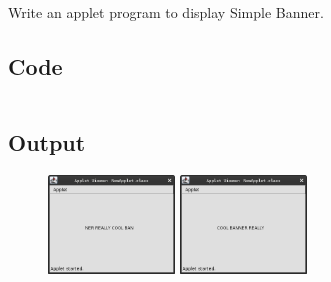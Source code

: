 \documentclass[../main.tex]{subfiles}
\begin{document}
Write an applet program to display Simple Banner.

\subsection{Code}
\inputminted[frame=lines, breaklines, breakanywhere, numberblanklines=false]{java}{./programs/prog19/Banner.java}

\subsection{Output}
\begin{figure}[h!]
	\centering
	\includegraphics[width=0.3\textwidth]{./assets/p19-s1.png}
	\includegraphics[width=0.3\textwidth]{./assets/p19-s2.png}
\end{figure}
\end{document}
